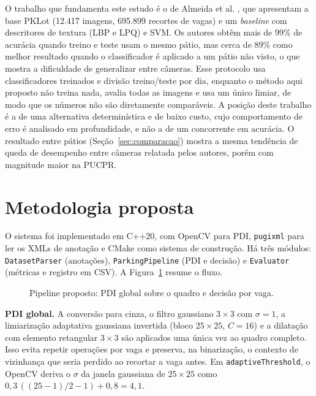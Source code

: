 \documentclass[
	article,			%
	11pt,				%
	oneside,			%
	a4paper,			%
	english,			%
	brazil,				%
	sumario=tradicional
	]{abntex2}
\begin{document}
O trabalho que fundamenta este estudo é o de Almeida et al. \cite{almeida2015pklot}, que apresentam a base PKLot (12.417 imagens, 695.899 recortes de vagas) e um \textit{baseline} com descritores de textura (LBP e LPQ) e SVM. Os autores obtêm mais de 99\% de acurácia quando treino e teste usam o mesmo pátio, mas cerca de 89\% como melhor resultado quando o classificador é aplicado a um pátio não visto, o que mostra a dificuldade de generalizar entre câmeras. Esse protocolo usa classificadores treinados e divisão treino/teste por dia, enquanto o método aqui proposto não treina nada, avalia todas as imagens e usa um único limiar, de modo que os números não são diretamente comparáveis. A posição deste trabalho é a de uma alternativa determinística e de baixo custo, cujo comportamento de erro é analisado em profundidade, e não a de um concorrente em acurácia. O resultado entre pátios (Seção~\ref{sec:comparacao}) mostra a mesma tendência de queda de desempenho entre câmeras relatada pelos autores, porém com magnitude maior na PUCPR.

\section{Metodologia proposta}

O sistema foi implementado em C++20, com OpenCV \cite{bradski2000opencv} para PDI, \texttt{pugixml} \cite{pugixml} para ler os XMLs de anotação e CMake como sistema de construção. Há três módulos: \texttt{DatasetParser} (anotações), \texttt{ParkingPipeline} (PDI e decisão) e \texttt{Evaluator} (métricas e registro em CSV). A Figura~\ref{fig:pipeline} resume o fluxo.

\begin{figure}[htbp]
\centering
\caption{Pipeline proposto: PDI global sobre o quadro e decisão por vaga.}
\label{fig:pipeline}
\small
{}
\end{figure}

\textbf{PDI global.} A conversão para cinza, o filtro gaussiano $3\times3$ com $\sigma=1$, a limiarização adaptativa gaussiana invertida (bloco $25\times25$, $C=16$) e a dilatação com elemento retangular $3\times3$ são aplicados uma única vez ao quadro completo. Isso evita repetir operações por vaga e preserva, na binarização, o contexto de vizinhança que seria perdido ao recortar a vaga antes. Em \texttt{adaptiveThreshold}, o OpenCV deriva o $\sigma$ da janela gaussiana de $25\times25$ como $0{,}3\,((25-1)/2-1)+0{,}8=4{,}1$.
\end{document}
